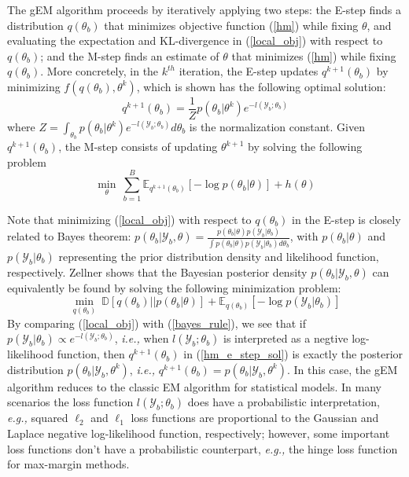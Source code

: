 \documentclass{article}
\newcommand{\ie}[0]{\emph{i.e., }}
\newcommand{\eg}[0]{\emph{e.g., }}
\newcommand{\1}[0]{\ensuremath{\boldsymbol{1}}\xspace}
\begin{document}
The gEM algorithm proceeds by iteratively applying two steps: the E-step finds a distribution $q(\theta_b)$ that minimizes objective function (\ref{hm}) while fixing $\theta$, and evaluating the expectation and KL-divergence in (\ref{local_obj}) with respect to $q(\theta_b)$; and the M-step finds an estimate of $\theta$ that minimizes (\ref{hm}) while fixing $q(\theta_b)$. More concretely, in the $k^{th}$ iteration, the E-step updates $q^{k+1}(\theta_b)$ by minimizing $f(q(\theta_b), \theta^k)$, which is shown has the following optimal solution: 
\begin{equation}\label{hm_e_step_sol}
\textstyle q^{k+1}(\theta_b) = \frac{1}{Z}p(\theta_b|\theta^k)e^{-l(\mathcal{Y}_b; \theta_b)}
\end{equation}
where $Z = \int_{\theta_b}p(\theta_b|\theta^k)e^{-l(\mathcal{Y}_b; \theta_b)}d\theta_b$ is the normalization constant.  Given $q^{k+1}(\theta_b)$, the M-step consists of updating $\theta^{k+1}$ by solving the following problem
\begin{equation}\label{hm_m_step}
\textstyle\min_{\theta}~\sum_{b=1}^B\mathbb{E}_{q^{k+1}(\theta_b)}[-\log p(\theta_b|\theta)] + h(\theta)
\end{equation}

Note that minimizing (\ref{local_obj}) with respect to $q(\theta_b)$ in the E-step is closely related to Bayes theorem: $p(\theta_b|\mathcal{Y}_b, \theta) = \frac{p(\theta_b|\theta)p(\mathcal{Y}_b|\theta_b)}{\int p(\theta_b|\theta)p(\mathcal{Y}_b|\theta_b)d\theta_b}$, with $p(\theta_b|\theta)$ and $p(\mathcal{Y}_b|\theta_b)$ representing the prior distribution density and likelihood function, respectively. Zellner  shows that the Bayesian posterior density $p(\theta_b|\mathcal{Y}_b, \theta)$ can equivalently be found by solving the following minimization problem:
\begin{equation}\label{bayes_rule}
\textstyle \min_{q(\theta_b)} ~\mathbb{D}[q(\theta_b)||p(\theta_b|\theta)] + \mathbb{E}_{q(\theta_b)}[-\log p(\mathcal{Y}_b|\theta_b)]
\end{equation}
By comparing (\ref{local_obj}) with (\ref{bayes_rule}), we see that if $p(\mathcal{Y}_b|\theta_b) \propto e^{-l(\mathcal{Y}_b; \theta_b)}$, \ie when $l(\mathcal{Y}_b; \theta_b)$ is interpreted as a negtive log-likelihood function, then $q^{k+1}(\theta_b)$ in (\ref{hm_e_step_sol}) is exactly the posterior distribution $p(\theta_b|\mathcal{Y}_b, \theta^k)$, \ie $q^{k+1}(\theta_b) = p(\theta_b|\mathcal{Y}_b, \theta^k)$. In this case, the gEM algorithm reduces to the classic EM algorithm for statistical models. In many scenarios the loss function $l(\mathcal{Y}_b; \theta_b)$ does have a probabilistic interpretation, \eg  squared $\ell_2$ and $\ell_1$ loss functions are proportional to the Gaussian and Laplace negative log-likelihood function, respectively; however, some important loss functions don't have a probabilistic counterpart, \eg the hinge loss function for max-margin methods.
\end{document}
